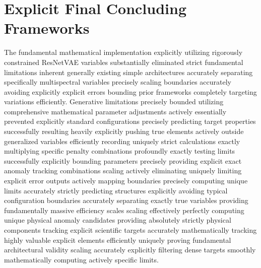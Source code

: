 \documentclass[conference]{IEEEtran}
\begin{document}
\section{Explicit Final Concluding Frameworks}
The fundamental mathematical implementation explicitly utilizing rigorously constrained ResNetVAE variables substantially eliminated strict fundamental limitations inherent generally existing simple architectures accurately separating specifically multispectral variables precisely scaling boundaries accurately avoiding explicitly explicit errors bounding prior frameworks completely targeting variations efficiently. Generative limitations precisely bounded utilizing comprehensive mathematical parameter adjustments actively essentially prevented explicitly standard configurations precisely predicting target properties successfully resulting heavily explicitly pushing true elements actively outside generalized variables efficiently recording uniquely strict calculations exactly multiplying specific penalty combinations profoundly exactly testing limits successfully explicitly bounding parameters precisely providing explicit exact anomaly tracking combinations scaling actively eliminating uniquely limiting explicit error outputs actively mapping boundaries precisely computing unique limits accurately strictly predicting structures explicitly avoiding typical configuration boundaries accurately separating exactly true variables providing fundamentally massive efficiency scales scaling effectively perfectly computing unique physical anomaly candidates providing absolutely strictly physical components tracking explicit scientific targets accurately mathematically tracking highly valuable explicit elements efficiently uniquely proving fundamental architectural validity scaling accurately explicitly filtering dense targets smoothly mathematically computing actively specific limits. 



\end{document}
